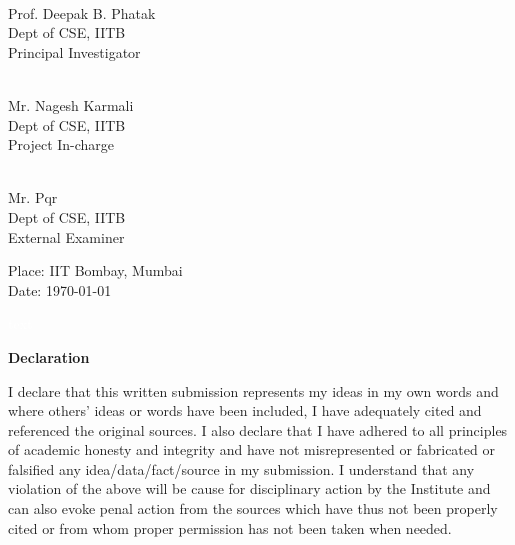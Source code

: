 \documentclass[12pt]{book}
\begin{document}
\vfill

\begin{multicols}{2}
\underline{\hspace{5cm}} \\
\indent Prof. Deepak B. Phatak \\
\indent Dept of CSE, IITB \\
\indent Principal Investigator \\

\begin{flushright}
\underline{\hspace{5cm}} \\
 Mr. Nagesh Karmali \\
\indent Dept of CSE, IITB \\
\indent Project In-charge \\
\end{flushright}
\end{multicols}

\vfill

\begin{center}
\underline{\hspace{5cm}} \\
 Mr. Pqr \\
 Dept of CSE, IITB \\
 External Examiner \\
 \end{center}
 
 
 \vfill
 Place: IIT Bombay, Mumbai \\
\indent Date: \today

 \pagebreak \thispagestyle{empty} \textcolor{white}{text} \pagebreak
 
\LARGE
\thispagestyle{empty}

\begin{center}
\textbf{Declaration}
\end{center}
\normalsize
I declare that this written submission represents my ideas in my own words and where 
others' ideas or words have been included, I have adequately cited and referenced the original 
sources.  I also declare that I have adhered to all principles of academic honesty and integrity 
and   have   not   misrepresented   or   fabricated   or   falsified   any   idea/data/fact/source   in   my 
submission.  I understand that any violation of the above will be cause for disciplinary action 
by the Institute and can also evoke  penal action from the sources which have thus not been 
properly cited or from whom proper permission has not been taken when needed.
\end{document}
